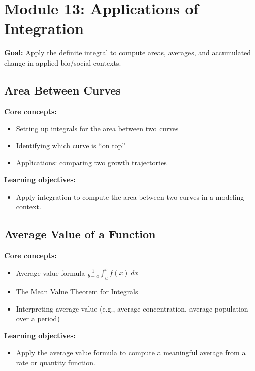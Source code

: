\documentclass{article}
\begin{document}
\section{Module 13: Applications of Integration}
\textbf{Goal:} Apply the definite integral to compute areas, averages, and accumulated change in applied bio/social contexts.

\subsection{Area Between Curves}
\textbf{Core concepts:}
\begin{itemize}[leftmargin=*]
  \item Setting up integrals for the area between two curves
  \item Identifying which curve is ``on top''
  \item Applications: comparing two growth trajectories
\end{itemize}
\textbf{Learning objectives:}
\begin{itemize}[leftmargin=*]
  \item Apply integration to compute the area between two curves in a modeling context.
\end{itemize}

\subsection{Average Value of a Function}
\textbf{Core concepts:}
\begin{itemize}[leftmargin=*]
  \item Average value formula $\frac{1}{b-a}\int_a^b f(x)\,dx$
  \item The Mean Value Theorem for Integrals
  \item Interpreting average value (e.g., average concentration, average population over a period)
\end{itemize}
\textbf{Learning objectives:}
\begin{itemize}[leftmargin=*]
  \item Apply the average value formula to compute a meaningful average from a rate or quantity function.
\end{itemize}
\end{document}

